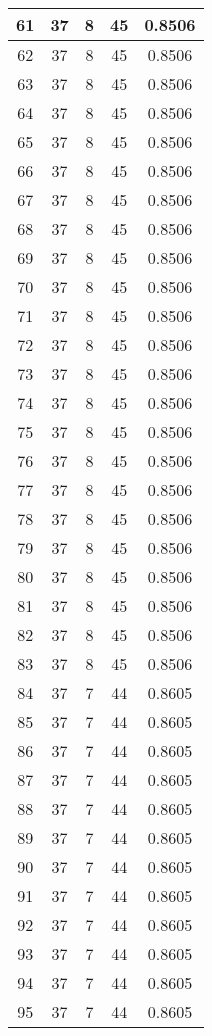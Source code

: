 \documentclass[letterpaper, 12pt]{article}
\begin{document}
\begin{longtable}{|c|c|c|c|c|}
61 & 37 & 8 & 45 & 0.8506 \\
\hline
62 & 37 & 8 & 45 & 0.8506 \\
\hline
63 & 37 & 8 & 45 & 0.8506 \\
\hline
64 & 37 & 8 & 45 & 0.8506 \\
\hline
65 & 37 & 8 & 45 & 0.8506 \\
\hline
66 & 37 & 8 & 45 & 0.8506 \\
\hline
67 & 37 & 8 & 45 & 0.8506 \\
\hline
68 & 37 & 8 & 45 & 0.8506 \\
\hline
69 & 37 & 8 & 45 & 0.8506 \\
\hline
70 & 37 & 8 & 45 & 0.8506 \\
\hline
71 & 37 & 8 & 45 & 0.8506 \\
\hline
72 & 37 & 8 & 45 & 0.8506 \\
\hline
73 & 37 & 8 & 45 & 0.8506 \\
\hline
74 & 37 & 8 & 45 & 0.8506 \\
\hline
75 & 37 & 8 & 45 & 0.8506 \\
\hline
76 & 37 & 8 & 45 & 0.8506 \\
\hline
77 & 37 & 8 & 45 & 0.8506 \\
\hline
78 & 37 & 8 & 45 & 0.8506 \\
\hline
79 & 37 & 8 & 45 & 0.8506 \\
\hline
80 & 37 & 8 & 45 & 0.8506 \\
\hline
81 & 37 & 8 & 45 & 0.8506 \\
\hline
82 & 37 & 8 & 45 & 0.8506 \\
\hline
83 & 37 & 8 & 45 & 0.8506 \\
\hline
84 & 37 & 7 & 44 & 0.8605 \\
\hline
85 & 37 & 7 & 44 & 0.8605 \\
\hline
86 & 37 & 7 & 44 & 0.8605 \\
\hline
87 & 37 & 7 & 44 & 0.8605 \\
\hline
88 & 37 & 7 & 44 & 0.8605 \\
\hline
89 & 37 & 7 & 44 & 0.8605 \\
\hline
90 & 37 & 7 & 44 & 0.8605 \\
\hline
91 & 37 & 7 & 44 & 0.8605 \\
\hline
92 & 37 & 7 & 44 & 0.8605 \\
\hline
93 & 37 & 7 & 44 & 0.8605 \\
\hline
94 & 37 & 7 & 44 & 0.8605 \\
\hline
95 & 37 & 7 & 44 & 0.8605 \\

\end{longtable}
\end{document}
